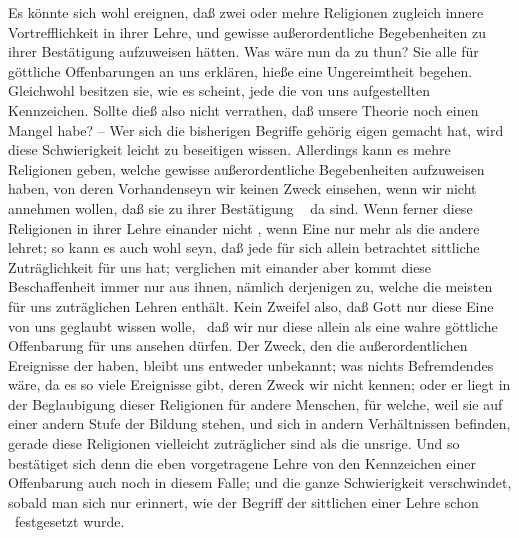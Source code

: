\begin{RWanm}
Es könnte sich wohl ereignen, daß zwei oder mehre Religionen zugleich innere Vortrefflichkeit in ihrer Lehre, und gewisse außerordentliche Begebenheiten zu ihrer Bestätigung aufzuweisen hätten. Was wäre nun da zu thun? Sie alle  für göttliche Offenbarungen an uns erklären, hieße eine Ungereimtheit begehen. Gleichwohl besitzen sie, wie es scheint, jede die von uns aufgestellten Kennzeichen. Sollte dieß also nicht verrathen, daß unsere Theorie noch einen Mangel habe? -- Wer sich die bisherigen Begriffe gehörig eigen gemacht hat, wird diese Schwierigkeit leicht zu beseitigen wissen. Allerdings kann es mehre Religionen geben, welche gewisse außerordentliche Begebenheiten aufzuweisen haben, von deren Vorhandenseyn wir keinen Zweck einsehen, wenn wir nicht annehmen wollen, daß sie zu ihrer Bestätigung ~ da sind. Wenn ferner diese Religionen in ihrer Lehre einander nicht , wenn Eine nur mehr als die andere lehret; so kann es auch wohl seyn, daß jede für sich allein betrachtet sittliche Zuträglichkeit für uns hat; verglichen mit einander aber kommt diese Beschaffenheit immer nur  aus ihnen, nämlich derjenigen zu, welche die meisten für uns zuträglichen Lehren enthält. Kein Zweifel also, daß Gott nur diese Eine von uns geglaubt wissen wolle, \dh\ daß wir nur diese allein als eine wahre göttliche Offenbarung für uns ansehen dürfen. Der Zweck, den die außerordentlichen Ereignisse der  haben, bleibt uns entweder unbekannt; was nichts Befremdendes wäre, da es so viele Ereignisse gibt, deren Zweck wir nicht kennen; oder er liegt in der Beglaubigung dieser Religionen für andere Menschen, für welche, weil sie auf einer andern Stufe der Bildung stehen, und sich in andern Verhältnissen befinden, gerade diese Religionen vielleicht zuträglicher sind als die unsrige. Und so bestätiget sich denn die eben vorgetragene Lehre von den Kennzeichen einer Offenbarung auch noch in diesem Falle; und die ganze Schwierigkeit verschwindet, sobald man sich nur erinnert, wie der Begriff der sittlichen  einer Lehre schon \ festgesetzt wurde. 
\end{RWanm}

